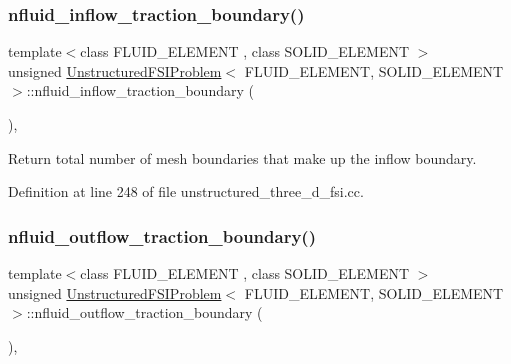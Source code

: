 \subsubsection{\texorpdfstring{nfluid\+\_\+inflow\+\_\+traction\+\_\+boundary()}{nfluid\_inflow\_traction\_boundary()}}
{\footnotesize\ttfamily template$<$class F\+L\+U\+I\+D\+\_\+\+E\+L\+E\+M\+E\+NT , class S\+O\+L\+I\+D\+\_\+\+E\+L\+E\+M\+E\+NT $>$ \\
unsigned \hyperlink{classUnstructuredFSIProblem}{Unstructured\+F\+S\+I\+Problem}$<$ F\+L\+U\+I\+D\+\_\+\+E\+L\+E\+M\+E\+NT, S\+O\+L\+I\+D\+\_\+\+E\+L\+E\+M\+E\+NT $>$\+::nfluid\+\_\+inflow\+\_\+traction\+\_\+boundary (\begin{DoxyParamCaption}{ }\end{DoxyParamCaption})\hspace{0.3cm}{\ttfamily [inline]}, {\ttfamily [private]}}



Return total number of mesh boundaries that make up the inflow boundary. 



Definition at line 248 of file unstructured\+\_\+three\+\_\+d\+\_\+fsi.\+cc.

\mbox{\label{classUnstructuredFSIProblem_acc6f2d0f03a9bc1af96e85b54824a16b}} 
\subsubsection{\texorpdfstring{nfluid\+\_\+outflow\+\_\+traction\+\_\+boundary()}{nfluid\_outflow\_traction\_boundary()}}
{\footnotesize\ttfamily template$<$class F\+L\+U\+I\+D\+\_\+\+E\+L\+E\+M\+E\+NT , class S\+O\+L\+I\+D\+\_\+\+E\+L\+E\+M\+E\+NT $>$ \\
unsigned \hyperlink{classUnstructuredFSIProblem}{Unstructured\+F\+S\+I\+Problem}$<$ F\+L\+U\+I\+D\+\_\+\+E\+L\+E\+M\+E\+NT, S\+O\+L\+I\+D\+\_\+\+E\+L\+E\+M\+E\+NT $>$\+::nfluid\+\_\+outflow\+\_\+traction\+\_\+boundary (\begin{DoxyParamCaption}{ }\end{DoxyParamCaption})\hspace{0.3cm}{\ttfamily [inline]}, {\ttfamily [private]}}



